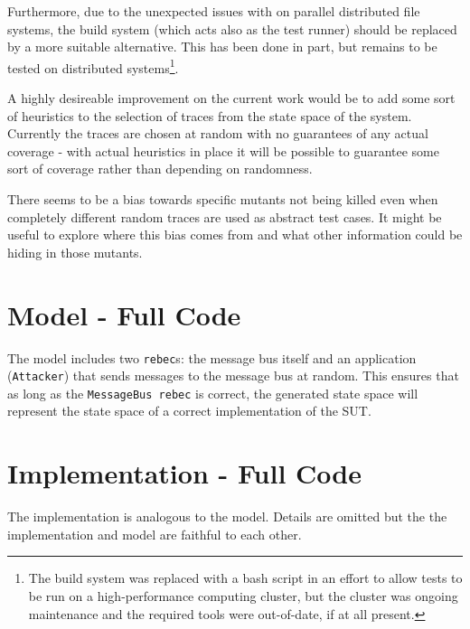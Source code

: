 \documentclass{article}
\begin{document}
		Furthermore, due to the unexpected issues with \citeauthor{sbt} on parallel distributed file systems, the build system (which acts also as the test runner) should be replaced by a more suitable alternative. This has been done in part, but remains to be tested on distributed systems\footnote{The build system was replaced with a bash script in an effort to allow tests to be run on a high-performance computing cluster, but the cluster was ongoing maintenance and the required tools were out-of-date, if at all present.}.

		A highly desireable improvement on the current work would be to add some sort of heuristics to the selection of traces from the state space of the system. Currently the traces are chosen at random with no guarantees of any actual coverage \-- with actual heuristics in place it will be possible to guarantee some sort of coverage rather than depending on randomness.

		There seems to be a bias towards specific mutants not being killed even when completely different random traces are used as abstract test cases. It might be useful to explore where this bias comes from and what other information could be hiding in those mutants.

\newpage


\newpage
\begin{appendices}

\section{\Rebeca Model - Full Code}



The \Rebeca model includes two \texttt{rebec}s: the message bus itself and an application (\texttt{Attacker}) that sends messages to the message bus at random. This ensures that as long as the \texttt{MessageBus rebec} is correct, the generated state space will represent the state space of a correct implementation of the SUT.

\newpage
\section{Implementation - Full Code}



The implementation is analogous to the \Rebeca model. Details are omitted but the the implementation and model are faithful to each other. 

%
%
%
%
%

\end{appendices}
\end{document}
